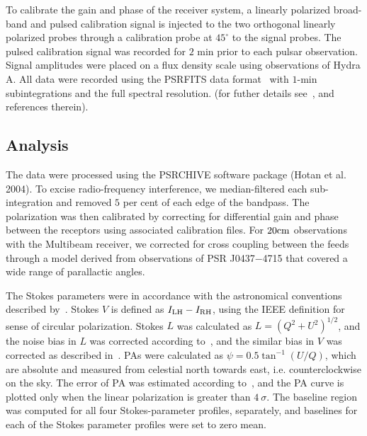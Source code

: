 \documentclass[useAMS,usenatbib]{mn2e}
\begin{document}
To calibrate the gain and phase of the receiver system, a linearly polarized 
broad-band and pulsed calibration signal is injected to the two orthogonal 
linearly polarized probes through a calibration probe at $45^{\circ}$ to the 
signal probes. The pulsed calibration signal was recorded for $2$ min prior to 
each pulsar observation.
%
Signal amplitudes were placed on a flux density scale using observations of 
Hydra A.
%
All data were recorded using the PSRFITS data format~\citep{Hotan04} with 
$1$-min subintegrations and the full spectral resolution.
%
(for futher details see~\citet{Manchester13}, and references therein). 
%

%


\subsection{Analysis}

The data were processed using the PSRCHIVE software package (Hotan et al. 2004). 
To excise radio-frequency interference, we median-filtered each sub-integration 
and removed $5$ per cent of each edge of the bandpass.
%
The polarization was then calibrated by correcting for differential gain and 
phase between the receptors using associated calibration files.
%
For $20\rm{cm}$ observations with the Multibeam receiver, we corrected for 
cross coupling between the feeds through a model derived from observations of 
PSR J0437$-$4715 that covered a wide range of parallactic angles.
%

The Stokes parameters were in accordance with the astronomical conventions described 
by~\citet{vanStraten10}. Stokes $V$ is defined as $I_{\rm{LH}}-I_{\rm{RH}}$, 
using the IEEE definition for sense of circular polarization. 
%
Stokes $L$ was calculated as $L=(Q^2+U^2)^{1/2}$, and the noise bias in $L$ 
was corrected according to~\citet{Lorimer05}, and the similar bias in 
$V$ was corrected as described in~\citet{Yan11}.
%
PAs were calculated as $\psi=0.5\tan^{-1}(U/Q)$, which are absolute 
and measured from celestial north towards east, i.e. counterclockwise on the sky.
%
The error of PA was estimated according to~\citet{Everett01}, and 
the PA curve is plotted only when the linear polarization is greater than 
$4\ \sigma$.
%
The baseline region was computed for all four Stokes-parameter profiles, separately, 
and baselines for each of the Stokes parameter profiles were set to zero mean.
%
\end{document}
